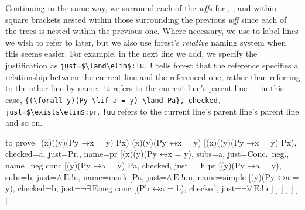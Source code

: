 \documentclass[10pt,british,a4paper]{ltxdoc}
\newcommand*\pkg[1]{\textsf{#1}}
\newcommand*{\lif}{\ensuremath{\mathbin{\rightarrow}}}
\newcommand*{\liff}{\ensuremath{\mathbin{\leftrightarrow}}}
\newcommand*{\elim}{\,\text{E}}
\newcommand*\wff{\emph{wff}}
\begin{document}
Continuing in the same way, we surround each of the \wff{}s for \nyth*{}, \nyth*{}, \nyth*{} and \nyth*{} within square brackets nested within those surrounding the previous \wff{} since each of the trees is nested within the previous one.
Where necessary, we use  to label lines we wish to refer to later, but we also use \pkg{forest}'s \emph{relative} naming system when this seems easier.
For example, in the next line we add, we specify the justification as \verb|just=$\land\elim$:!u|.
\verb|!| tells \pkg{forest} that the reference specifies a relationship between the current line and the referenced one, rather than referring to the other line by name.
\verb|!u| refers to the current line's parent line --- in this case, \verb|{(\forall y)(Py \lif a = y) \land Pa}, checked, just=$\exists\elim$:pr|.
\verb|!uu| refers to the current line's parent line's parent line and so on.
\begin{latexcode}
\begin{prooftree}
  {
    to prove={(\exists x)((\forall y)(Py \lif x = y) \land Px) \sststile{}{} (\exists x)(\forall y)(Py \liff x = y)}
  }
  [{(\exists x)((\forall y)(Py \lif x = y) \land Px)}, checked=a, just=Pr., name=pr
    [{\lnot (\exists x)(\forall y)(Py \liff x = y)}, subs=a, just=Conc.~neg., name=neg conc
      [{(\forall y)(Py \lif a = y) \land Pa}, checked, just=$\exists\elim$:pr
        [{(\forall y)(Py \lif a = y)}, subs=b, just=$\land\elim$:!u, name=mark
          [Pa, just=$\land\elim$:!uu, name=simple
            [{\lnot (\forall y)(Py \liff a = y)}, checked=b, just=$\lnot\exists\elim$:neg conc
              [{\lnot (Pb \liff a = b)}, checked, just=$\lnot\forall\elim$:!u
              ]
            ]
          ]
        ]
      ]
    ]
  ]
\end{prooftree}
\end{latexcode}
\end{document}
